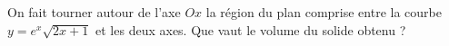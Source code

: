 \begin{exercice}\label{exoTP40001}

	On fait tourner autour de l'axe $Ox$ la région du plan comprise entre la courbe $y=e^x\sqrt{2x+1}$ et les deux axes. Que vaut le volume du solide obtenu ?

\end{exercice}
